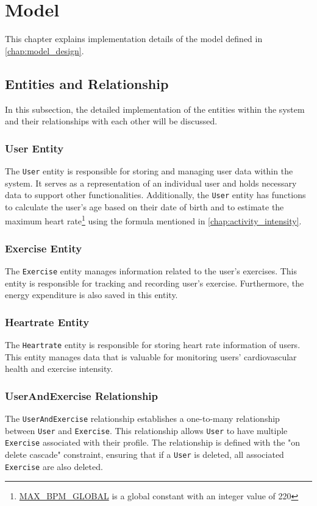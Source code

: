 \section{Model}
\label{chap:model_impl}
This chapter explains implementation details of the model defined in \autoref{chap:model_design}.

\subsection{Entities and Relationship}
\label{chap:objectmodel_impl}
In this subsection, the detailed implementation of the entities within the system and their relationships with each other will be discussed.

\subsubsection{User Entity}
The \verb;User; entity is responsible for storing and managing user data within the system.
It serves as a representation of an individual user and holds necessary data to support other functionalities.
Additionally, the \verb;User; entity has functions to calculate the user's age based on their date of birth and to estimate the maximum heart rate\footnote{\url{MAX_BPM_GLOBAL} is a global constant with an integer value of 220} using the formula mentioned in \autoref{chap:activity_intensity}.


\subsubsection{Exercise Entity}
The \verb;Exercise; entity manages information related to the user's exercises. 
This entity is responsible for tracking and recording user's exercise. Furthermore, the energy expenditure is also saved in this entity.


\subsubsection{Heartrate Entity}
The \verb;Heartrate; entity is responsible for storing heart rate information of users. 
This entity manages data that is valuable for monitoring users' cardiovascular health and exercise intensity.


\subsubsection{UserAndExercise Relationship}
The \verb;UserAndExercise; relationship establishes a one-to-many relationship between \verb;User; and \verb;Exercise;. 
This relationship allows \verb;User; to have multiple \verb;Exercise; associated with their profile. 
The relationship is defined with the "on delete cascade" constraint, ensuring that if a \verb;User; is deleted, all associated \verb;Exercise; are also deleted.

